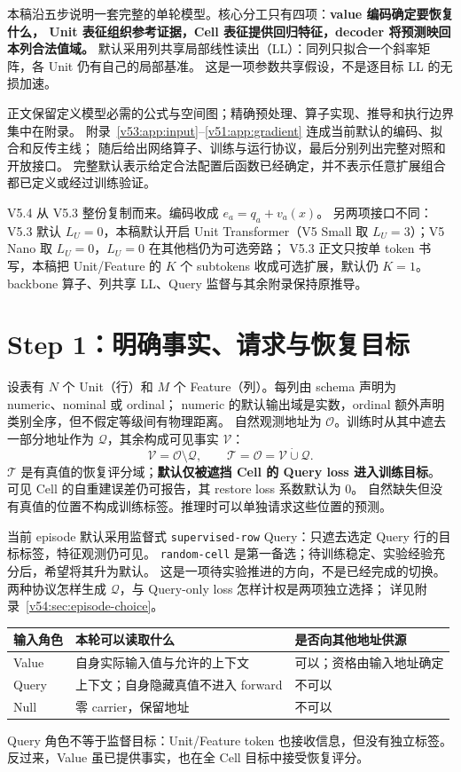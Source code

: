 \documentclass[11pt,UTF8,fontset=fandol]{ctexart}
\numberwithin{equation}{section}
\theoremstyle{definition}
\newcommand{\Oset}{\mathcal O}
\newcommand{\Vset}{\mathcal V}
\newcommand{\Qset}{\mathcal Q}
\newcommand{\TargetSet}{\mathcal T}
\begin{document}
本稿沿五步说明一套完整的单轮模型。核心分工只有四项：\textbf{value 编码确定要恢复什么，
Unit 表征组织参考证据，Cell 表征提供回归特征，decoder 将预测映回本列合法值域。}
默认采用列共享局部线性读出（LL）：同列只拟合一个斜率矩阵，各 Unit 仍有自己的局部基准。
这是一项参数共享假设，不是逐目标 LL 的无损加速。

正文保留定义模型必需的公式与空间图；精确预处理、算子实现、推导和执行边界集中在附录。
附录~\ref{v53:app:input}--\ref{v51:app:gradient} 连成当前默认的编码、拟合和反传主线；
随后给出网络算子、训练与运行协议，最后分别列出完整对照和开放接口。
完整默认表示给定合法配置后函数已经确定，并不表示任意扩展组合都已定义或经过训练验证。

V5.4 从 V5.3 整份复制而来。编码收成 $e_a=q_a+v_a(x)$。
另两项接口不同：V5.3 默认 $L_U=0$，本稿默认开启 Unit Transformer（V5 Small 取 $L_U=3$）；V5 Nano 取 $L_U=0$，$L_U=0$ 在其他档仍为可选旁路；
V5.3 正文只按单 token 书写，本稿把 Unit/Feature 的 $K$ 个 subtokens 收成可选扩展，默认仍 $K=1$。
backbone 算子、列共享 LL、Query 监督与其余附录保持原推导。

\section{Step 1：明确事实、请求与恢复目标}
\label{front:sec:step1}\label{sec:P:problem}
设表有 $N$ 个 Unit（行）和 $M$ 个 Feature（列）。每列由 schema 声明为 numeric、nominal 或 ordinal；
numeric 的默认输出域是实数，ordinal 额外声明类别全序，但不假定等级间有物理距离。
自然观测地址为 $\Oset$。训练时从其中遮去一部分地址作为 $\Qset$，其余构成可见事实 $\Vset$：
\begin{equation}
 \boxed{\Vset=\Oset\setminus\Qset,\qquad
 \TargetSet=\Oset=\Vset\mathbin{\dot\cup}\Qset.}
 \label{v53:eq:task}
\end{equation}
$\TargetSet$ 是有真值的恢复评分域；\textbf{默认仅被遮挡 Cell 的 Query loss 进入训练目标}。
可见 Cell 的自重建误差仍可报告，其 restore loss 系数默认为 0。
自然缺失但没有真值的位置不构成训练标签。推理时可以单独请求这些位置的预测。

当前 episode 默认采用监督式 \texttt{supervised-row} Query：只遮去选定 Query 行的目标标签，特征观测仍可见。
\texttt{random-cell} 是第一备选；待训练稳定、实验经验充分后，希望将其升为默认。
这是一项待实验推进的方向，不是已经完成的切换。两种协议怎样生成 $\Qset$，与 Query-only loss 怎样计权是两项独立选择；
详见附录~\ref{v54:sec:episode-choice}。

\begin{center}\small
\begin{tabularx}{\linewidth}{lXX}
\toprule
输入角色 & 本轮可以读取什么 & 是否向其他地址供源\\\midrule
Value & 自身实际输入值与允许的上下文 & 可以；资格由输入地址确定\\
Query & 上下文；自身隐藏真值不进入 forward & 不可以\\
Null & 零 carrier，保留地址 & 不可以\\\bottomrule
\end{tabularx}
\end{center}
Query 角色不等于监督目标：Unit/Feature token 也接收信息，但没有独立标签。
反过来，Value 虽已提供事实，也在全 Cell 目标中接受恢复评分。
\end{document}

